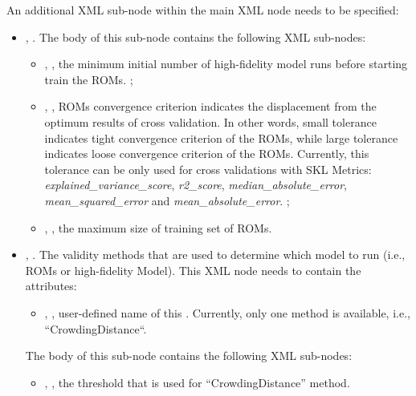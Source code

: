 An additional XML sub-node within the main  XML node needs to be specified:
\begin{itemize}
  \item {}, .
  The body of this sub-node  contains the following XML sub-nodes:
  \begin{itemize}
     \item {}, , the minimum initial number of high-fidelity
       model runs before starting train the ROMs.
       ;
     \item {}, , ROMs convergence criterion indicates the displacement
       from the optimum results of cross validation. In other words, small tolerance indicates tight convergence criterion
       of the ROMs, while large tolerance indicates loose convergence criterion of the ROMs.
       \nb Currently, this tolerance can be only used for cross validations with SKL Metrics: \textit{explained\_variance\_score},
       \textit{r2\_score}, \textit{median\_absolute\_error}, \textit{mean\_squared\_error} and \textit{mean\_absolute\_error}.
       ;
     \item {}, , the maximum size of training set of ROMs.
  \end{itemize}
  \item {}, .
  The validity methods that are used to determine which model to run (i.e., ROMs or high-fidelity Model).
  This XML node needs to contain the attributes:
  \begin{itemize}
    \itemsep0em
    \item {}, , user-defined name
      of this .
      \nb Currently, only one method is available, i.e., ``CrowdingDistance``.
  \end{itemize}
  The body of this sub-node contains the following XML sub-nodes:
  \begin{itemize}
     \item {}, , the threshold that is used for ``CrowdingDistance'' method.
  \end{itemize}
\end{itemize}


